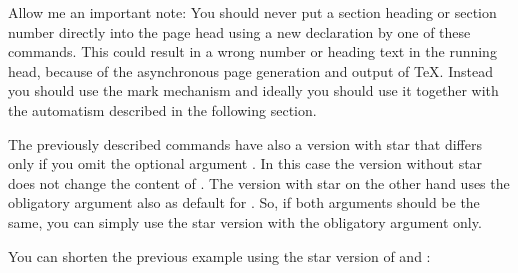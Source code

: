 Allow me an important note: You should never put a
section heading or section number directly into the page head using a new
declaration by one of these commands. This could result in a wrong number or
heading text in the running head, because of the asynchronous page generation
and output of \TeX. Instead you should use the mark mechanism and ideally you
should use it together with the automatism described in the following
section.%
\EndIndexGroup

\begin{Declaration}
\end{Declaration}
The previously described commands have also a version with
star that differs only if you
omit the optional argument . In this case
the version without star does not change the content of
. The version with star on the other hand uses
the obligatory argument  also as default for
. So, if both arguments should be the same, you
can simply use the star version with the obligatory argument only.%

\begin{Example}
  You can shorten the previous example using the star version of
   and :
\end{Example}


